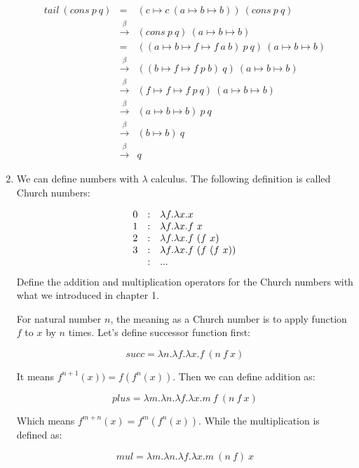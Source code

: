 \documentclass[UTF8]{article}
\begin{document}
\begin{enumerate}
\[
\begin{array}{rcl}
tail\ (cons\ p\ q) & = & (c \mapsto c\ (a \mapsto b \mapsto b))\ (cons\ p\ q) \\
                   & \xrightarrow{\beta} & (cons\ p\ q)\ (a \mapsto b \mapsto b) \\
                   & = & ((a \mapsto b \mapsto f \mapsto f\ a\ b)\ p\ q)\ (a \mapsto b \mapsto b) \\
                   & \xrightarrow{\beta} & ((b \mapsto f \mapsto f\ p\ b)\ q)\ (a \mapsto b \mapsto b) \\
                   & \xrightarrow{\beta} & (f \mapsto f \mapsto f\ p\ q)\ (a \mapsto b \mapsto b) \\
                   & \xrightarrow{\beta} & (a \mapsto b \mapsto b)\ p\ q \\
                   & \xrightarrow{\beta} & (b \mapsto b)\ q \\
                   & \xrightarrow{\beta} & q
\end{array}
\]

\item {We can define numbers with $\lambda$ calculus. The following definition is called Church numbers:

\[
\begin{array}{r@{\quad:\quad}l}
0 & \lambda f . \lambda x . x \\
1 & \lambda f . \lambda x . f\ x \\
2 & \lambda f . \lambda x . f\ (f\ x) \\
3 & \lambda f . \lambda x . f\ (f\ (f\ x)) \\
  & ...
\end{array}
\]
Define the addition and multiplication operators for the Church numbers with what we introduced in chapter 1.
}

For natural number $n$, the meaning as a Church number is to apply function $f$ to $x$ by $n$ times. Let's define successor function first:

\[
succ = \lambda n . \lambda f . \lambda x . f\ (n\ f\ x)
\]

It means $f^{n+1}(x)) = f(f^n(x))$. Then we can define addition as:

\[
plus = \lambda m . \lambda n . \lambda f . \lambda x . m\ f\ (n\ f\ x)
\]

Which means $f^{m + n}(x) = f^m(f^n(x))$. While the multiplication is defined as:

\[
mul = \lambda m . \lambda n . \lambda f . \lambda x . m\ (n\ f)\ x
\]


\end{enumerate}
\end{document}
